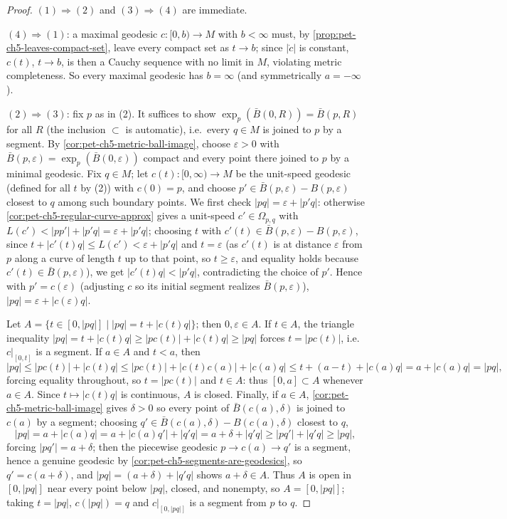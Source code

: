 \begin{proof}
  $(1)\Rightarrow(2)$ and $(3)\Rightarrow(4)$ are immediate.

  $(4)\Rightarrow(1)$: a maximal geodesic $c:[0,b)\to M$ with $b<\infty$ must, by
  \cref{prop:pet-ch5-leaves-compact-set}, leave every compact set as $t\to b$; since
  $|\dot c|$ is constant, $c(t)$, $t\to b$, is then a Cauchy sequence with no limit
  in $M$, violating metric completeness. So every maximal geodesic has $b=\infty$
  (and symmetrically $a=-\infty$).

  $(2)\Rightarrow(3)$: fix $p$ as in (2). It suffices to show
  $\exp_p(\bar B(0,R))=\bar B(p,R)$ for all $R$ (the inclusion $\subset$ is
  automatic), i.e.\ every $q\in M$ is joined to $p$ by a segment. By
  \cref{cor:pet-ch5-metric-ball-image}, choose $\varepsilon>0$ with
  $\bar B(p,\varepsilon)=\exp_p(\bar B(0,\varepsilon))$ compact and every point
  there joined to $p$ by a minimal geodesic. Fix $q\in M$; let
  $c(t):[0,\infty)\to M$ be the unit-speed geodesic (defined for all $t$ by (2))
  with $c(0)=p$, and choose $p'\in\bar B(p,\varepsilon)-B(p,\varepsilon)$ closest to
  $q$ among such boundary points. We first check $|pq|=\varepsilon+|p'q|$: otherwise
  \cref{cor:pet-ch5-regular-curve-approx} gives a unit-speed $c'\in\Omega_{p,q}$
  with $L(c')<|pp'|+|p'q|=\varepsilon+|p'q|$; choosing $t$ with
  $c'(t)\in\bar B(p,\varepsilon)-B(p,\varepsilon)$, since
  $t+|c'(t)q|\le L(c')<\varepsilon+|p'q|$ and $t=\varepsilon$ (as $c'(t)$ is at
  distance $\varepsilon$ from $p$ along a curve of length $t$ up to that point, so
  $t\ge\varepsilon$, and equality holds because $c'(t)\in\bar B(p,\varepsilon)$), we
  get $|c'(t)q|<|p'q|$, contradicting the choice of $p'$. Hence with $p'=c(\varepsilon)$
  (adjusting $c$ so its initial segment realizes $\bar B(p,\varepsilon)$), $|pq|=
  \varepsilon+|c(\varepsilon)q|$.

  Let $A=\{t\in[0,|pq|]\mid|pq|=t+|c(t)q|\}$; then $0,\varepsilon\in A$. If $t\in A$,
  the triangle inequality
  $|pq|=t+|c(t)q|\ge|pc(t)|+|c(t)q|\ge|pq|$ forces $t=|pc(t)|$, i.e.\ $c|_{[0,t]}$
  is a segment. If $a\in A$ and $t<a$, then
  \[
    |pq|\le|pc(t)|+|c(t)q|\le|pc(t)|+|c(t)c(a)|+|c(a)q|\le t+(a-t)+|c(a)q|=a+|c(a)q|=|pq|,
  \]
  forcing equality throughout, so $t=|pc(t)|$ and $t\in A$: thus $[0,a]\subset A$
  whenever $a\in A$. Since $t\mapsto|c(t)q|$ is continuous, $A$ is closed. Finally,
  if $a\in A$, \cref{cor:pet-ch5-metric-ball-image} gives $\delta>0$ so every point
  of $\bar B(c(a),\delta)$ is joined to $c(a)$ by a segment; choosing $q'\in
  \bar B(c(a),\delta)-B(c(a),\delta)$ closest to $q$,
  \[
    |pq|=a+|c(a)q|=a+|c(a)q'|+|q'q|=a+\delta+|q'q|\ge|pq'|+|q'q|\ge|pq|,
  \]
  forcing $|pq'|=a+\delta$; then the piecewise geodesic $p\to c(a)\to q'$ is a
  segment, hence a genuine geodesic by \cref{cor:pet-ch5-segments-are-geodesics},
  so $q'=c(a+\delta)$, and $|pq|=(a+\delta)+|q'q|$ shows $a+\delta\in A$. Thus $A$
  is open in $[0,|pq|]$ near every point below $|pq|$, closed, and nonempty, so
  $A=[0,|pq|]$; taking $t=|pq|$, $c(|pq|)=q$ and $c|_{[0,|pq|]}$ is a segment from
  $p$ to $q$.
\end{proof}

